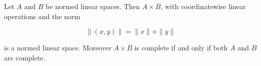 Let $A$ and $B$ be normed linear spaces. Then $A \times B$, with coordinatewise linear operations and the norm

$$\|(x, y)\| = \|x\| + \|y\|$$

is a normed linear space. Moreover $A \times B$ is complete if and only if both $A$ and $B$ are complete.